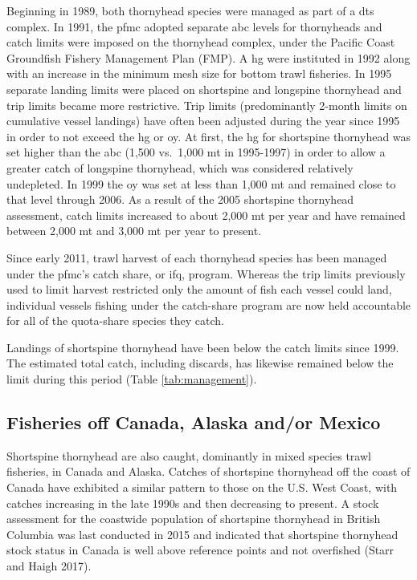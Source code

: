 \documentclass[11pt,
  letterpaper,
]{article}
\begin{document}
Beginning in 1989, both thornyhead species were managed as part of a \gls{dts} complex. In 1991, the \gls{pfmc} adopted separate \gls{abc} levels for thornyheads and catch limits were imposed on the thornyhead complex, under the Pacific Coast Groundfish Fishery Management Plan (FMP). A \Gls{hg} were instituted in 1992 along with an increase in the minimum mesh size for bottom trawl fisheries. In 1995 separate landing limits were placed on shortspine and longspine thornyhead and trip limits became more restrictive. Trip limits (predominantly 2-month limits on cumulative vessel landings) have often been adjusted during the year since 1995 in order to not exceed the \Gls{hg} or \gls{oy}. At first, the \gls{hg} for shortspine thornyhead was set higher than the \gls{abc} (1,500 vs.~1,000 mt in 1995-1997) in order to allow a greater catch of longspine thornyhead, which was considered relatively undepleted. In 1999 the \gls{oy} was set at less than 1,000 mt and remained close to that level through 2006. As a result of the 2005 shortspine thornyhead assessment, catch limits increased to about 2,000 mt per year and have remained between 2,000 mt and 3,000 mt per year to present.

Since early 2011, trawl harvest of each thornyhead species has been managed under the \gls{pfmc}'s catch share, or \gls{ifq}, program. Whereas the trip limits previously used to limit harvest restricted only the amount of fish each vessel could land, individual vessels fishing under the catch-share program are now held accountable for all of the quota-share species they catch.

Landings of shortspine thornyhead have been below the catch limits since 1999. The estimated total catch, including discards, has likewise remained below the limit during this period (Table \ref{tab:management}).

\hypertarget{fisheries-off-canada-alaska-andor-mexico}{%
\subsection{Fisheries off Canada, Alaska and/or Mexico}\label{fisheries-off-canada-alaska-andor-mexico}}

Shortspine thornyhead are also caught, dominantly in mixed species trawl fisheries, in Canada and Alaska. Catches of shortspine thornyhead off the coast of Canada have exhibited a similar pattern to those on the U.S. West Coast, with catches increasing in the late 1990s and then decreasing to present. A stock assessment for the coastwide population of shortspine thornyhead in British Columbia was last conducted in 2015 and indicated that shortspine thornyhead stock status in Canada is well above reference points and not overfished (Starr and Haigh 2017).
\end{document}
